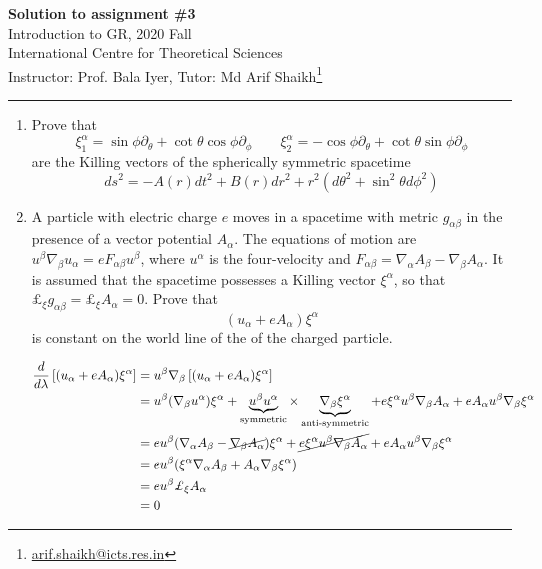 \documentclass{article}
\begin{document}
\begin{center}
  {\bfseries Solution to assignment \#3}\\
  Introduction to GR, 2020 Fall\\
  International Centre for Theoretical Sciences\\
  Instructor: Prof. Bala Iyer, Tutor: Md Arif Shaikh\footnote{\href{mailto: arif.shaikh@icts.res.in}{arif.shaikh@icts.res.in}}\\
\end{center}
\hrule

\begin{enumerate}
\item[3.] Prove that
  \begin{equation}
    \label{eq:Killing-vectors-sph}
    \xi^\alpha_{1} = \sin\phi\partial_\theta + \cot\theta\cos\phi\partial_\phi\qquad \xi^\alpha_{2} = - \cos\phi\partial_\theta + \cot\theta\sin\phi\partial_\phi
  \end{equation}
  are the Killing vectors of the spherically symmetric spacetime
  \begin{equation}
    \label{eq:line-element-spherically-symmetric}
    ds^2 = -A(r)dt^2 + B(r)dr^2 + r^2 (d\theta^2 + \sin^2\theta d\phi^2)
  \end{equation}
  
\item[4.] A particle with electric charge $e$ moves in a spacetime with metric $g_{\alpha\beta}$ in the presence of a vector potential $A_\alpha$. The equations of motion are $u^\beta \nabla_\beta u_\alpha = e F_{\alpha\beta}u^\beta$, where $u^\alpha$ is the four-velocity and $F_{\alpha\beta}=\nabla_\alpha A_\beta - \nabla_\beta A_\alpha$. It is assumed that the spacetime possesses a Killing vector $\xi^\alpha$, so that $\pounds_\xi g_{\alpha\beta} = \pounds_\xi A_\alpha = 0$. Prove that
  \begin{equation}
    \label{eq:conserved-quantity-em-field}
    (u_\alpha + e A_\alpha)\xi^\alpha
  \end{equation}
  is constant on the world line of the of the charged particle.

  \begin{align*}
    \frac{d}{d\lambda}\left[(u_\alpha + e A_\alpha)\xi^\alpha\right]
    & = u^\beta\nabla_\beta\left[(u_\alpha + e A_\alpha)\xi^\alpha\right]\\
    & = u^\beta(\nabla_\beta u^\alpha)\xi^\alpha + \underbrace{u^\beta u^\alpha}_{\text{symmetric}}\times \underbrace{\nabla_\beta \xi^\alpha}_{\text{anti-symmetric}} + e \xi^\alpha u^\beta\nabla_\beta A_\alpha + e A_\alpha u^\beta \nabla_\beta \xi^\alpha\\
    & = eu^\beta(\nabla_\alpha A_\beta - \cancel{\nabla_\beta A_\alpha})\xi^\alpha + \cancel{e\xi^\alpha u^\beta \nabla_\beta A_\alpha} + e A_\alpha u^\beta \nabla_\beta \xi^\alpha\\
    & = e u^\beta (\xi^\alpha\nabla_\alpha A_\beta + A_\alpha \nabla_\beta \xi^\alpha)\\
    & = e u^\beta \pounds_\xi A_\alpha\\
    & = 0
  \end{align*}


\end{enumerate}
\end{document}
